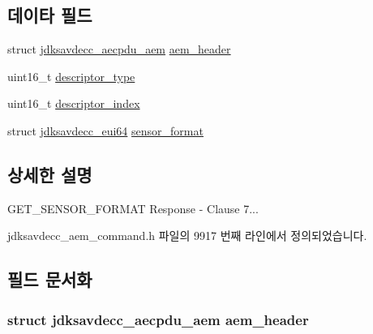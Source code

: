 \subsection*{데이타 필드}
\begin{DoxyCompactItemize}
\item 
struct \hyperlink{structjdksavdecc__aecpdu__aem}{jdksavdecc\+\_\+aecpdu\+\_\+aem} \hyperlink{structjdksavdecc__aem__command__get__sensor__format__response_ae1e77ccb75ff5021ad923221eab38294}{aem\+\_\+header}
\item 
uint16\+\_\+t \hyperlink{structjdksavdecc__aem__command__get__sensor__format__response_ab7c32b6c7131c13d4ea3b7ee2f09b78d}{descriptor\+\_\+type}
\item 
uint16\+\_\+t \hyperlink{structjdksavdecc__aem__command__get__sensor__format__response_a042bbc76d835b82d27c1932431ee38d4}{descriptor\+\_\+index}
\item 
struct \hyperlink{structjdksavdecc__eui64}{jdksavdecc\+\_\+eui64} \hyperlink{structjdksavdecc__aem__command__get__sensor__format__response_a100aa7be90c95e113ca53584ab78094a}{sensor\+\_\+format}
\end{DoxyCompactItemize}


\subsection{상세한 설명}
G\+E\+T\+\_\+\+S\+E\+N\+S\+O\+R\+\_\+\+F\+O\+R\+M\+AT Response -\/ Clause 7... 

jdksavdecc\+\_\+aem\+\_\+command.\+h 파일의 9917 번째 라인에서 정의되었습니다.



\subsection{필드 문서화}
\subsubsection[{\texorpdfstring{aem\+\_\+header}{aem_header}}]{\setlength{\rightskip}{0pt plus 5cm}struct {\bf jdksavdecc\+\_\+aecpdu\+\_\+aem} aem\+\_\+header}\hypertarget{structjdksavdecc__aem__command__get__sensor__format__response_ae1e77ccb75ff5021ad923221eab38294}{}\label{structjdksavdecc__aem__command__get__sensor__format__response_ae1e77ccb75ff5021ad923221eab38294}


